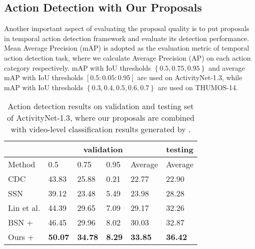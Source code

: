 \documentclass[10pt,twocolumn,letterpaper]{article}
\begin{document}
\subsection{Action Detection with Our Proposals}

Another important aspect of evaluating the proposal quality is to put proposals in temporal action detection framework and evaluate its detection performance.
Mean Average Precision (mAP) is adopted as the evaluation metric of temporal action detection task, where we calculate Average Precision (AP) on each action category respectively. mAP with IoU thresholds $\left \{0.5,0.75,0.95\right \}$ and average mAP with IoU thresholds $[0.5:0.05:0.95]$ are used on ActivityNet-1.3, while mAP with IoU thresholds $\left \{0.3,0.4,0.5,0.6,0.7 \right \}$ are used on THUMOS-14.




\begin{table}[tbp]
\centering
\caption{Action detection results on validation and testing set of ActivityNet-1.3, where our proposals are combined with video-level classification results generated by \cite{zhao2017cuhk}.  }
\small
\begin{tabular}{p{2.1cm}p{0.62cm}<{\centering}p{0.62cm}<{\centering}p{0.62cm}<{\centering}p{0.9cm}<{\centering}p{0.9cm}<{\centering}}
\toprule
 & \multicolumn{4}{c}{validation} & testing  \\
\hline
Method  & 0.5  &  0.75  & 0.95  & Average  & Average  \\
\hline
CDC \cite{shou2017cdc}    & 43.83  & 25.88  & 0.21   & 22.77  & 22.90 \\
SSN \cite{xiong2017pursuit}    & 39.12 & 23.48  & 5.49  & 23.98 & 28.28 \\
Lin et al. \cite{lin2017temporal} & 44.39   & 29.65  & 7.09  & 29.17 & 32.26 \\
BSN \cite{lin2018bsn} + \cite{zhao2017cuhk} & 46.45  & 29.96 & 8.02  & 30.03 & 32.87 \\
\hline
Ours + \cite{zhao2017cuhk} & {\bf 50.07} & {\bf 34.78} & {\bf 8.29} & {\bf 33.85} & {\bf 36.42} \\
\bottomrule
\end{tabular}
\label{table_detection_anet}
\end{table}
\end{document}
